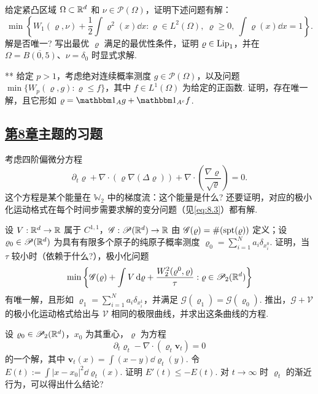 \begin{exercise}\label{ex:47}
给定紧凸区域 $\Omega\subset\mathbb R^d$ 和 $\nu\in\mathscr P(\Omega)$，证明下述问题有解：
\[
\min\left\{W_1(\varrho,\nu)+\frac12\int\varrho^2(x)\dd x:
\varrho\in L^2(\Omega),\ \varrho\geq0,\ \int\varrho(x)\dd x=1\right\}.
\]
解是否唯一? 写出最优 $\varrho$ 满足的最优性条件，证明 $\varrho\in\operatorname{Lip}_1$，并在 $\Omega=\overline{B(0,5)}$、$\nu=\delta_0$ 时显式求解.
\end{exercise}

\begin{exercise}\label{ex:48}
** 给定 $p>1$，考虑绝对连续概率测度 $g\in\mathscr P(\Omega)$，以及问题 $\min\{W_p(\varrho,g):\varrho\leq f\}$，其中 $f\in L^1(\Omega)$ 为给定的正函数. 证明，存在唯一解，且它形如 $\varrho=\mathbbm1_Ag+\mathbbm1_{A^c}f$.
\end{exercise}

\subsection*{\hyperref[sec:8]{第8章}主题的习题}
\begin{exercise}\label{ex:49}
考虑四阶偏微分方程
\[
\partial_t\varrho+\nabla\cdot(\varrho\nabla(\Delta\varrho))
+\nabla\cdot\left(\frac{\nabla\varrho}{\sqrt\varrho}\right)=0.
\]
这个方程是某个能量在 $\mathbb W_2$ 中的梯度流：这个能量是什么? 还要证明，对应的极小化运动格式在每个时间步需要求解的变分问题（见\eqref{eq:8.3}）都有解.
\end{exercise}

\begin{exercise}\label{ex:50}
设 $V:\mathbb R^d\to\mathbb R$ 属于 $C^{1,1}$，$\mathscr G:\mathscr P(\mathbb R^d)\to\mathbb R$ 由 $\mathscr G(\varrho)=\#(\operatorname{spt}(\varrho))$ 定义；设 $\varrho_0\in\mathscr P(\mathbb R^d)$ 为具有有限多个原子的纯原子概率测度 $\varrho_0=\sum_{i=1}^Na_i\delta_{x_i^0}$. 证明，当 $\tau$ 较小时（依赖于什么?），极小化问题
\[
\min\left\{\mathscr G(\varrho)+\int V\,\mathrm d\varrho+\frac{W_2^2(\varrho^0,\varrho)}\tau:
\varrho\in\mathscr P_2(\mathbb R^d)\right\}
\]
有唯一解，且形如 $\varrho_1=\sum_{i=1}^Na_i\delta_{x_i^1}$，并满足 $\mathscr G(\varrho_1)=\mathscr G(\varrho_0)$. 推出，$\mathscr G+\mathscr V$ 的极小化运动格式给出与 $\mathscr V$ 相同的极限曲线，并求出这条曲线的方程.
\end{exercise}

\begin{exercise}\label{ex:51}
设 $\varrho_0\in\mathscr P_2(\mathbb R^d)$，$x_0$ 为其重心，$\varrho$ 为方程
\[
\partial_t\varrho_t-\nabla\cdot(\varrho_t\mathbf v_t)=0
\]
的一个解，其中 $\mathbf v_t(x)=\int(x-y)\dd\varrho_t(y)$. 令 $E(t):=\int|x-x_0|^2\dd\varrho_t(x)$. 证明 $E'(t)\leq-E(t)$. 对 $t\to\infty$ 时 $\varrho_t$ 的渐近行为，可以得出什么结论?
\end{exercise}

